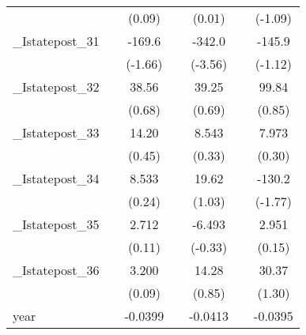 {\begin{tabular}{l*{6}{c}}
            &                     &      (0.09)         &                     &      (0.01)         &                     &     (-1.09)         \\
[1em]
\_Istatepost\_31&                     &      -169.6         &                     &      -342.0\sym{**} &                     &      -145.9         \\
            &                     &     (-1.66)         &                     &     (-3.56)         &                     &     (-1.12)         \\
[1em]
\_Istatepost\_32&                     &       38.56         &                     &       39.25         &                     &       99.84         \\
            &                     &      (0.68)         &                     &      (0.69)         &                     &      (0.85)         \\
[1em]
\_Istatepost\_33&                     &       14.20         &                     &       8.543         &                     &       7.973         \\
            &                     &      (0.45)         &                     &      (0.33)         &                     &      (0.30)         \\
[1em]
\_Istatepost\_34&                     &       8.533         &                     &       19.62         &                     &      -130.2         \\
            &                     &      (0.24)         &                     &      (1.03)         &                     &     (-1.77)         \\
[1em]
\_Istatepost\_35&                     &       2.712         &                     &      -6.493         &                     &       2.951         \\
            &                     &      (0.11)         &                     &     (-0.33)         &                     &      (0.15)         \\
[1em]
\_Istatepost\_36&                     &       3.200         &                     &       14.28         &                     &       30.37         \\
            &                     &      (0.09)         &                     &      (0.85)         &                     &      (1.30)         \\
[1em]
year        &                     &     -0.0399\sym{***}&                     &     -0.0413\sym{***}&                     &     -0.0395\sym{***}\\

\end{tabular}}
